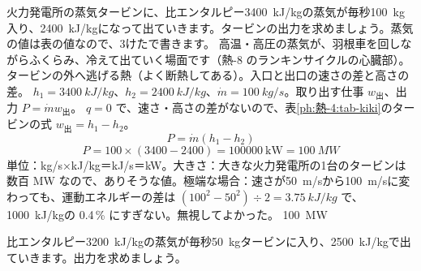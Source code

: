 \begin{phreidai}[火力発電所の蒸気タービン]
\label{ph:熱-4:ex3}火力発電所の蒸気タービンに、比エンタルピー\qty{3400}{kJ/kg}の蒸気が毎秒\qty{100}{kg}入り、\qty{2400}{kJ/kg}になって出ていきます。タービンの出力を求めましょう。蒸気の値は表の値なので、3けたで書きます。
\phbamen
高温・高圧の蒸気が、羽根車を回しながらふくらみ、冷えて出ていく場面です（熱-8 のランキンサイクルの心臓部）。
\phmushi
タービンの外へ逃げる熱（よく断熱してある）。入口と出口の速さの差と高さの差。
\phzu
$h_1=\qty{3400}{kJ/kg}$、$h_2=\qty{2400}{kJ/kg}$、$\dot m=\qty{100}{kg/s}$。取り出す仕事 $w_{\text{出}}$、出力 $P=\dot mw_{\text{出}}$。
\phriyu
$q=0$ で、速さ・高さの差がないので、表\ref{ph:熱-4:tab-kiki}のタービンの式 $w_{\text{出}}=h_1-h_2$。
\phtateru
\[ P=\dot m(h_1-h_2) \]
\phtoku
\[ P=100\times(3400-2400)=\num{100000}\ \mathrm{kW}=\qty{100}{MW} \]
\phtashikame
単位：kg/s×kJ/kg＝kJ/s＝kW。大きさ：大きな火力発電所の1台のタービンは数百 MW なので、ありそうな値。極端な場合：速さが\qty{50}{m/s}から\qty{100}{m/s}に変わっても、運動エネルギーの差は $(100^2-50^2)\div2=\qty{3.75}{kJ/kg}$ で、\qty{1000}{kJ/kg}の 0.4\,\% にすぎない。無視してよかった。
\kotae \qty{100}{MW}
\end{phreidai}
\begin{jibun}
比エンタルピー\qty{3200}{kJ/kg}の蒸気が毎秒\qty{50}{kg}タービンに入り、\qty{2500}{kJ/kg}で出ていきます。出力を求めましょう。
\end{jibun}


